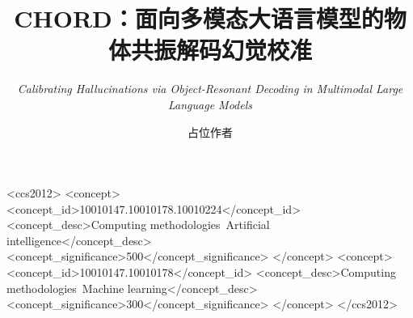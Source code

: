 \documentclass[sigconf, screen, review, anonymous]{acmart}
\begin{document}
\title[CHORD]{CHORD：面向多模态大语言模型的物体共振解码幻觉校准}
\subtitle{\textit{Calibrating Hallucinations via Object-Resonant Decoding in Multimodal Large Language Models}}

\author{占位作者}

\begin{abstract}

\end{abstract}

\begin{CCSXML}
<ccs2012>
 <concept>
  <concept_id>10010147.10010178.10010224</concept_id>
  <concept_desc>Computing methodologies~Artificial intelligence</concept_desc>
  <concept_significance>500</concept_significance>
 </concept>
 <concept>
  <concept_id>10010147.10010178</concept_id>
  <concept_desc>Computing methodologies~Machine learning</concept_desc>
  <concept_significance>300</concept_significance>
 </concept>
</ccs2012>
\end{CCSXML}



\maketitle








\appendix




\end{document}

